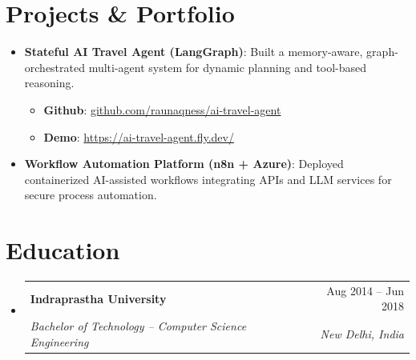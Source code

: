 \documentclass[letterpaper,10pt]{article}
\makeatletter
\newcommand{\resumeItem}[1]{\item\small{#1}}
\newcommand{\resumeSubheading}[4]{
\vspace{-1pt}\item
  \begin{tabular*}{0.97\textwidth}[t]{l@{\extracolsep{\fill}}r}
    \textbf{#1} & #2 \\
    \textit{#3} & \textit{#4} \\
  \end{tabular*}\vspace{-7pt}
}
\newcommand{\resumeSubHeadingList}{\begin{itemize}[leftmargin=0.15in, label={}]}
\newcommand{\resumeSubHeadingListEnd}{\end{itemize}}
\makeatother
\begin{document}
\section{Projects \& Portfolio}
\resumeSubHeadingList
  \resumeItem{\textbf{Stateful AI Travel Agent (LangGraph)}: Built a memory-aware, graph-orchestrated multi-agent system for dynamic planning and tool-based reasoning.}
  \begin{itemize}[leftmargin=1.4em,label=•,topsep=0pt,partopsep=0pt,parsep=0pt]
      \item \small{\textbf{Github}: \href{https://github.com/raunaqness/ai-travel-agent}{github.com/raunaqness/ai-travel-agent}}
      \item \small{\textbf{Demo}: \href{https://ai-travel-agent.fly.dev/}{https://ai-travel-agent.fly.dev/}}
  \end{itemize}
  \resumeItem{\textbf{Workflow Automation Platform (n8n + Azure)}: Deployed containerized AI-assisted workflows integrating APIs and LLM services for secure process automation.}
\resumeSubHeadingListEnd

\section{Education}
\resumeSubHeadingList
  \resumeSubheading
      {Indraprastha University}{Aug 2014 -- Jun 2018}
      {Bachelor of Technology -- Computer Science Engineering}{New Delhi, India}
\resumeSubHeadingListEnd
\end{document}
